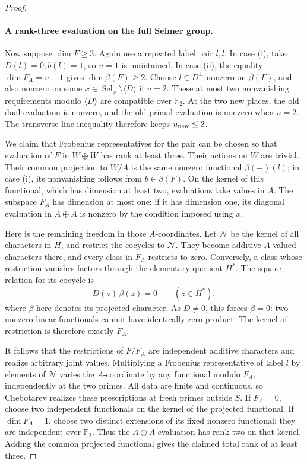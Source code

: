 \begin{proof}
\paragraph{A rank-three evaluation on the full Selmer group.}
Now suppose \(\dim F\ge3\).  Again use a repeated label pair \(l,l\).
In case (i), take \(D(l)=0,b(l)=1\), so \(u=1\) is maintained.  In case
(ii), the equality \(\dim F_A=u-1\) gives \(\dim\beta(F)\ge2\).  Choose
\(l\in D^\perp\) nonzero on \(\beta(F)\), and also nonzero on some
\(x\in\operatorname{Sel}_\phi\setminus\langle D\rangle\) if \(u=2\).
These at most two nonvanishing requirements modulo \(\langle D\rangle\)
are compatible over \(\mathbb F_2\).  At the two new places, the old dual
evaluation is nonzero, and the old primal evaluation is nonzero when
\(u=2\).  The transverse-line inequality therefore keeps \(u_{\rm new}\le2\).

We claim that Frobenius representatives for the pair can be chosen so
that evaluation of \(F\) in \(W\oplus W\) has rank at least three.
Their actions on \(W\) are trivial.  Their common projection to \(W/A\)
is the same nonzero functional \(\beta(-)(l)\); in case (i), its
nonvanishing follows from \(b\in\beta(F)\).  On the kernel of this
functional, which has dimension at least two, evaluations take values
in \(A\).  The subspace \(F_A\) has dimension at most one; if it has
dimension one, its diagonal evaluation in \(A\oplus A\) is nonzero by
the condition imposed using \(x\).

Here is the remaining freedom in those \(A\)-coordinates.  Let
\(\mathcal N\) be the kernel of all characters in \(H\), and restrict the
cocycles to \(\mathcal N\).  They become additive
\(A\)-valued characters there, and every class in \(F_A\) restricts to
zero.  Conversely, a class whose restriction vanishes factors through
the elementary quotient \(H^*\).  The square relation for its cocycle is
\[
 D(z)\,\beta(z)=0\qquad(z\in H^*),
\]
where \(\beta\) here denotes its projected character.  As \(D\ne0\),
this forces \(\beta=0\): two nonzero linear functionals cannot have
identically zero product.  The kernel of restriction is therefore exactly
\(F_A\).

It follows that the restrictions of \(F/F_A\) are independent additive
characters and realize arbitrary joint values.  Multiplying a Frobenius
representative of label \(l\) by elements of \(\mathcal N\) varies the
\(A\)-coordinate by any functional modulo \(F_A\), independently at the
two primes.  All data are finite and continuous, so Chebotarev realizes
these prescriptions at fresh primes outside \(S\).  If \(F_A=0\), choose
two independent functionals on the kernel of the
projected functional.  If \(\dim F_A=1\), choose two distinct extensions
of its fixed nonzero functional; they are independent over
\(\mathbb F_2\).  Thus the \(A\oplus A\)-evaluation has rank two on
that kernel.  Adding the common projected functional gives the claimed
total rank of at least three.


\end{proof}
